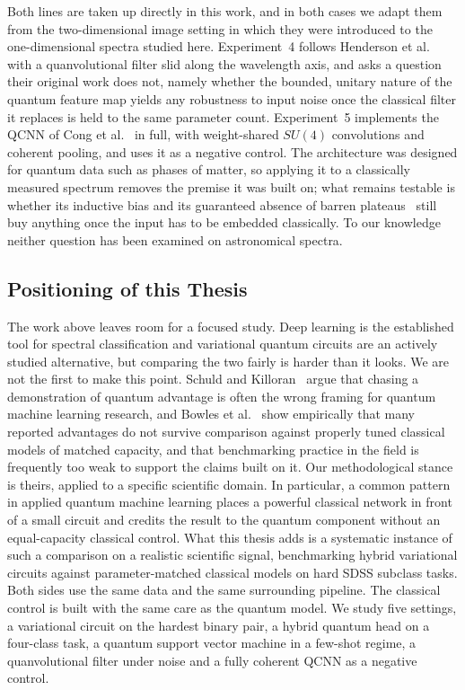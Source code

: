 Both lines are taken up directly in this work, and in both cases we adapt them from the
two-dimensional image setting in which they were introduced to the one-dimensional
spectra studied here. Experiment~4 follows Henderson et
al.~\cite{henderson2020quanvolutional} with a quanvolutional filter slid along the
wavelength axis, and asks a question their original work does not, namely whether the
bounded, unitary nature of the quantum feature map yields any robustness to input noise
once the classical filter it replaces is held to the same parameter count. Experiment~5
implements the QCNN of Cong et al.~\cite{cong2019qcnn} in full, with weight-shared
$SU(4)$ convolutions and coherent pooling, and uses it as a negative control. The
architecture was designed for quantum data such as phases of matter, so applying it to a
classically measured spectrum removes the premise it was built on; what remains testable
is whether its inductive bias and its guaranteed absence of barren
plateaus~\cite{pesah2021absence} still buy anything once the input has to be embedded
classically. To our knowledge neither question has been examined on astronomical spectra.

\subsection{Positioning of this Thesis}
\label{sec:rel_position}

The work above leaves room for a focused study. Deep learning is the established tool
for spectral classification and variational quantum circuits are an actively studied
alternative, but comparing the two fairly is harder than it looks. We are not the first
to make this point. Schuld and Killoran~\cite{schuld2022advantage} argue that chasing a
demonstration of quantum advantage is often the wrong framing for quantum machine
learning research, and Bowles et al.~\cite{bowles2024benchmarking} show empirically that
many reported advantages do not survive comparison against properly tuned classical
models of matched capacity, and that benchmarking practice in the field is frequently
too weak to support the claims built on it. Our methodological stance is theirs, applied
to a specific scientific domain. In particular, a common pattern in applied quantum
machine learning places a powerful classical network in front of a small circuit and
credits the result to the quantum component without an equal-capacity classical control.
What this thesis adds is a systematic instance of such a comparison on a realistic
scientific signal, benchmarking hybrid variational circuits against parameter-matched
classical models on hard SDSS subclass tasks. Both sides use the same data and the same surrounding
pipeline. The classical control is built with the same care as the quantum model. We
study five settings, a variational circuit on the hardest binary pair, a hybrid
quantum head on a four-class task, a quantum support vector machine in a few-shot
regime, a quanvolutional filter under noise and a fully coherent QCNN as a negative
control.

